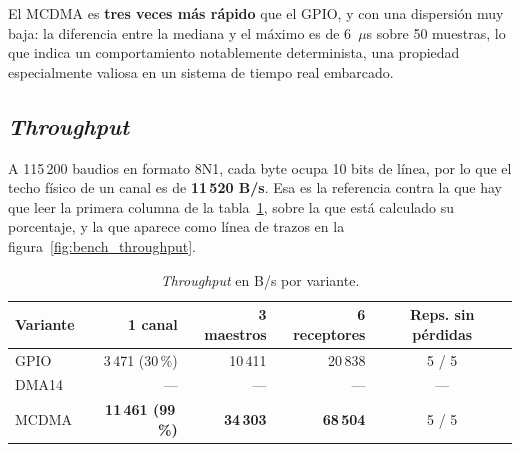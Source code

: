 El MCDMA es \textbf{tres veces más rápido} que el GPIO, y con una dispersión muy baja: la
diferencia entre la mediana y el máximo es de 6~$\mu$s sobre 50 muestras, lo que indica un
comportamiento notablemente determinista, una propiedad especialmente valiosa en un sistema de
tiempo real embarcado.

\subsection{\textit{Throughput}}

A 115\,200 baudios en formato 8N1, cada byte ocupa 10 bits de línea, por lo que el techo físico
de un canal es de \textbf{11\,520 B/s}. Esa es la referencia contra la que hay que leer la
primera columna de la tabla~\ref{tab:bench_throughput}, sobre la que está calculado su porcentaje,
y la que aparece como línea de trazos en la figura~\ref{fig:bench_throughput}.

\begin{table}[H]
    \centering
    \begin{tabular}{lrrrc}
        \hline
        \textbf{Variante} & \textbf{1 canal} & \textbf{3 maestros} & \textbf{6 receptores} & \textbf{Reps. sin pérdidas} \\
        \hline
        GPIO  & 3\,471 (30\,\%) & 10\,411 & 20\,838 & 5 / 5 \\
        DMA14 & --- & --- & --- & --- \\
        MCDMA & \textbf{11\,461 (99\,\%)} & \textbf{34\,303} & \textbf{68\,504} & 5 / 5 \\
        \hline
    \end{tabular}
    \caption{\textit{Throughput} en B/s por variante.}
    \label{tab:bench_throughput}
\end{table}

